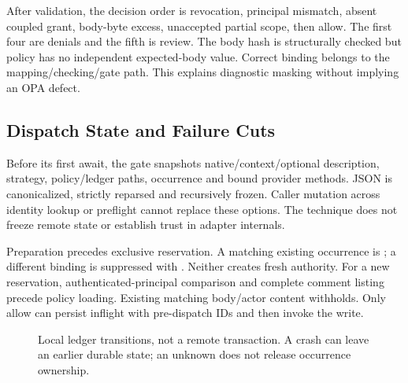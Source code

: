 \documentclass[11pt,letterpaper]{article}
\newcommand{\code}[1]{\texttt{\detokenize{#1}}}
\begin{document}
After validation, the decision order is revocation, principal mismatch, absent
coupled grant, body-byte excess, unaccepted partial scope, then allow. The first
four are denials and the fifth is review. The body hash is structurally checked
but policy has no independent expected-body value. Correct binding belongs to
the mapping/checking/gate path. This explains diagnostic masking without
implying an OPA defect.

\subsection{Dispatch State and Failure Cuts}

Before its first await, the gate snapshots native/context/optional description,
strategy, policy/ledger paths, occurrence and bound provider methods. JSON is
canonicalized, strictly reparsed and recursively frozen. Caller mutation across
identity lookup or preflight cannot replace these options. The technique does
not freeze remote state or establish trust in adapter internals.

Preparation precedes exclusive reservation. A matching existing occurrence is
; a different binding is suppressed
with \code{binding_mismatch}. Neither creates fresh authority. For a new
reservation, authenticated-principal comparison and complete comment listing
precede policy loading. Existing matching body/actor content withholds. Only
allow can persist inflight with pre-dispatch IDs and then invoke the write.

\begin{figure}[tbp]
\centering
{}
\caption{Local ledger transitions, not a remote transaction. A crash can leave
an earlier durable state; an unknown does not release occurrence ownership.}
\label{fig:states}
\end{figure}
\end{document}
